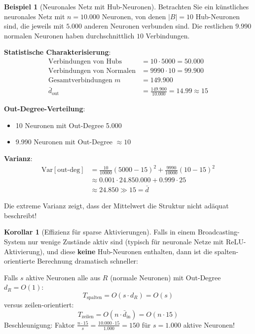 ﻿\documentclass[a4paper,12pt]{report}
\theoremstyle{definition}
\newtheorem{beispiel}{Beispiel}
\newtheorem{korollar}{Korollar}
\begin{document}
	\begin{beispiel}[Neuronales Netz mit Hub-Neuronen]
		Betrachten Sie ein künstliches neuronales Netz mit $n = 10.000$ Neuronen, von denen $|B| = 10$ Hub-Neuronen sind, die jeweils mit $5.000$ anderen Neuronen verbunden sind. Die restlichen $9.990$ normalen Neuronen haben durchschnittlich $10$ Verbindungen.
		
		\textbf{Statistische Charakterisierung}:
		\begin{align}
			\text{Verbindungen von Hubs} &= 10 \cdot 5000 = 50.000 \\
			\text{Verbindungen von Normalen} &= 9990 \cdot 10 = 99.900 \\
			\text{Gesamtverbindungen } m &= 149.900 \\
			\bar{d}_{\text{out}} &= \frac{149.900}{10.000} = 14.99 \approx 15
		\end{align}
		
		\textbf{Out-Degree-Verteilung}:
		\begin{itemize}
			\item 10 Neuronen mit Out-Degree 5.000
			\item 9.990 Neuronen mit Out-Degree $\approx 10$
		\end{itemize}
		
		\textbf{Varianz}:
		\begin{align}
			\text{Var}[\text{out-deg}] &= \frac{10}{10000}(5000 - 15)^2 + \frac{9990}{10000}(10 - 15)^2 \\
			&\approx 0.001 \cdot 24.850.000 + 0.999 \cdot 25 \\
			&\approx 24.850 \gg 15 = \bar{d}
		\end{align}
		
		Die extreme Varianz zeigt, dass der Mittelwert die Struktur nicht adäquat beschreibt!
	\end{beispiel}
	
	\begin{korollar}[Effizienz für sparse Aktivierungen]
		Falls in einem Broadcasting-System nur wenige Zustände aktiv sind (typisch für neuronale Netze mit ReLU-Aktivierung), und diese \textbf{keine} Hub-Neuronen enthalten, dann ist die spalten-orientierte Berechnung dramatisch schneller:
		
		Falls $s$ aktive Neuronen alle aus $R$ (normale Neuronen) mit Out-Degree $d_R = O(1)$:
		\[
		T_{\text{spalten}} = O(s \cdot d_R) = O(s)
		\]
		versus zeilen-orientiert:
		\[
		T_{\text{zeilen}} = O(n \cdot \bar{d}_{\text{in}}) = O(n \cdot 15)
		\]
		Beschleunigung: Faktor $\frac{n \cdot 15}{s} = \frac{10.000 \cdot 15}{1.000} = 150$ für $s = 1.000$ aktive Neuronen!
	\end{korollar}
	
\end{document}

